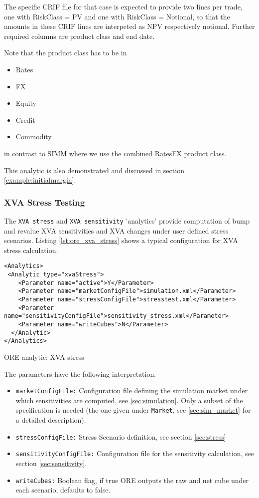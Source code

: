 {The specific CRIF file for that case is expected to provide two lines per trade, one with
RiskClass = PV and one with RiskClass = Notional, so that the amounts in these CRIF lines are
interpeted as NPV respectively notional. Further required columns are product class and end date.

Note that the product class has to be in
\begin{itemize}
\item Rates
\item FX
\item Equity
\item Credit
\item Commodity
\end{itemize}
in contrast to SIMM where we use the combined RatesFX product class.

This analytic is also demonstrated and discussed in section \ref{example:initialmargin}.

\subsubsection{XVA Stress Testing}

The {\tt XVA stress} and {\tt XVA sensitivity} 'analytics' provide computation of bump and revalue 
XVA sensitivities and XVA changes under user defined stress scenarios. Listing \ref{lst:ore_xva_stress}
shows a typical configuration for XVA stress calculation.

\begin{listing}[H]
\begin{verbatim}
<Analytics>
 <Analytic type="xvaStress">
    <Parameter name="active">Y</Parameter>
    <Parameter name="marketConfigFile">simulation.xml</Parameter>
    <Parameter name="stressConfigFile">stresstest.xml</Parameter>
    <Parameter name="sensitivityConfigFile">sensitivity_stress.xml</Parameter>
    <Parameter name="writeCubes">N</Parameter>
  </Analytic>
</Analytics>
\end{verbatim}
\caption{ORE analytic: XVA stress}
\label{lst:ore_xva_stress}
\end{listing}

The parameters have the following interpretation:

\begin{itemize}
\item {\tt marketConfigFile:} Configuration file defining the simulation market under which sensitivities are computed,
  see \ref{sec:simulation}. Only a subset of the specification is needed (the one given under {\tt Market}, see
  \ref{sec:sim_market} for a detailed description).
  \item {\tt stressConfigFile:} Stress Scenario definition, see section \ref{sec:stress}
  \item {\tt sensitivityConfigFile:} Configuration file  for the sensitivity calculation, see section \ref{sec:sensitivity}.
  \item {\tt writeCubes:} Boolean flag, if true ORE outputs the raw and net cube under each scenario, defaults to false.
\end{itemize}

}
